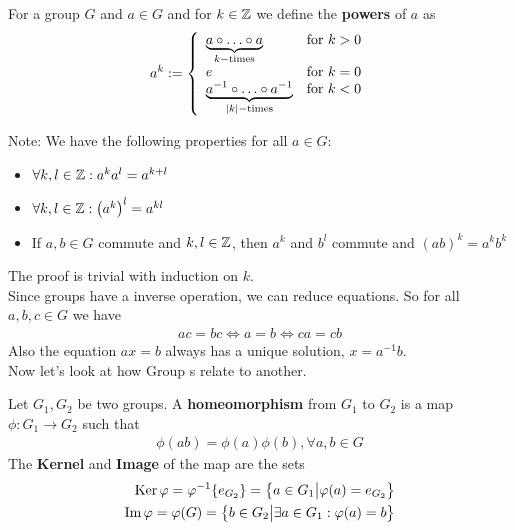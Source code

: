 \begin{definition}[powers]
	For a group $G$ and $a \in G$ and for $k \in \mathbb{Z}$  we define the \textbf{powers} of $a$ as
	\begin{align*}
		a^{k} := \left\{\begin{array}{ll}
				\underbrace{a \circ \ldots \circ a}_{k-\text{times}} & \text{for }k > 0\\
				e & \text{for } k = 0\\
				\underbrace{a^{-1} \circ \ldots \circ a^{-1}}_{\vert k\vert-\text{times}} & \text{for } k < 0
		\end{array} \right.
	\end{align*}
\end{definition}
Note: We have the following properties for all $a \in G$:
\begin{itemize}
\item $\forall k,l \in \mathbb{Z}: a^{k}a^{l} = a^{k+l}$
\item $\forall k,l \in \mathbb{Z}: \left(a^{k}\right)^{l} = a^{kl}$
\item If $a,b \in G$ commute and $k,l \in \mathbb{Z}$, then $a^{k}$ and $b^{l}$ commute and $\left(ab\right)^{k} = a^{k}b^{k}$
\end{itemize}
The proof is trivial with induction on $k$.\\

Since groups have a inverse operation, we can reduce equations. So for all $a,b,c \in G$ we have
\begin{align*}
	ac = bc \iff a = b \iff ca = cb
\end{align*}
Also the equation $ax = b$ always has a unique solution, $x = a^{-1}b$.\\

Now let's look at how Group s relate to another.
\begin{definition}[Homeomorphism]
	Let $G_1, G_2$ be two groups. A \textbf{homeomorphism} from $G_1$ to $G_2$ is a map $\phi: G_1 \to G_2$ such that
	\begin{align*}
		\phi(ab) = \phi(a) \phi(b), \forall a,b \in G
	\end{align*}
The \textbf{Kernel} and \textbf{Image} of the map are the sets
\begin{align*}
	\operatorname{Ker} \varphi = \varphi^{-1}\{e_{G_2}\} = \left\{a \in G_1 \big\vert \varphi(a) = e_{G_2}\right\}\\
	\operatorname{Im} \varphi = \varphi(G) = \left\{b \in G_2 \big\vert \exists a \in G_1: \varphi(a) = b\right\}
\end{align*}
\end{definition}

